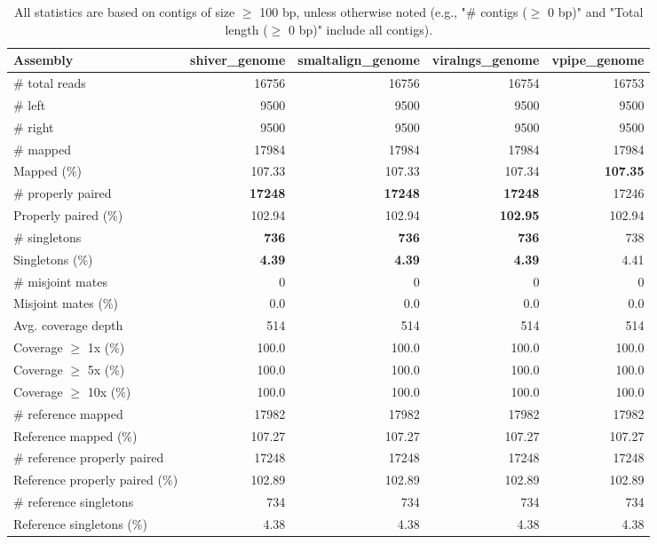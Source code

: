 \documentclass[12pt,a4paper]{article}
\begin{document}
\begin{table}[ht]
\begin{center}
\caption{All statistics are based on contigs of size $\geq$ 100 bp, unless otherwise noted (e.g., "\# contigs ($\geq$ 0 bp)" and "Total length ($\geq$ 0 bp)" include all contigs).}
\begin{tabular}{|l*{4}{|r}|}
\hline
Assembly & shiver\_genome & smaltalign\_genome & viralngs\_genome & vpipe\_genome \\ \hline
\# total reads & 16756 & 16756 & 16754 & 16753 \\ \hline
\# left & 9500 & 9500 & 9500 & 9500 \\ \hline
\# right & 9500 & 9500 & 9500 & 9500 \\ \hline
\# mapped & 17984 & 17984 & 17984 & 17984 \\ \hline
Mapped (\%) & 107.33 & 107.33 & 107.34 & {\bf 107.35} \\ \hline
\# properly paired & {\bf 17248} & {\bf 17248} & {\bf 17248} & 17246 \\ \hline
Properly paired (\%) & 102.94 & 102.94 & {\bf 102.95} & 102.94 \\ \hline
\# singletons & {\bf 736} & {\bf 736} & {\bf 736} & 738 \\ \hline
Singletons (\%) & {\bf 4.39} & {\bf 4.39} & {\bf 4.39} & 4.41 \\ \hline
\# misjoint mates & 0 & 0 & 0 & 0 \\ \hline
Misjoint mates (\%) & 0.0 & 0.0 & 0.0 & 0.0 \\ \hline
Avg. coverage depth & 514 & 514 & 514 & 514 \\ \hline
Coverage $\geq$ 1x (\%) & 100.0 & 100.0 & 100.0 & 100.0 \\ \hline
Coverage $\geq$ 5x (\%) & 100.0 & 100.0 & 100.0 & 100.0 \\ \hline
Coverage $\geq$ 10x (\%) & 100.0 & 100.0 & 100.0 & 100.0 \\ \hline
\# reference mapped & 17982 & 17982 & 17982 & 17982 \\ \hline
Reference mapped (\%) & 107.27 & 107.27 & 107.27 & 107.27 \\ \hline
\# reference properly paired & 17248 & 17248 & 17248 & 17248 \\ \hline
Reference properly paired (\%) & 102.89 & 102.89 & 102.89 & 102.89 \\ \hline
\# reference singletons & 734 & 734 & 734 & 734 \\ \hline
Reference singletons (\%) & 4.38 & 4.38 & 4.38 & 4.38 \\ \hline

\end{tabular}
\end{center}
\end{table}
\end{document}
